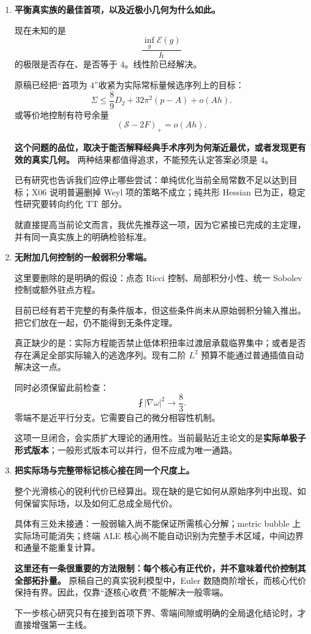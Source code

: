 \documentclass[
  10pt,
]{article}
\begin{document}
\begin{enumerate}
\def\labelenumi{\arabic{enumi}.}
\item
  \textbf{平衡真实族的最佳首项，以及近极小几何为什么如此。}

  现在未知的是 \[
  \frac{\inf_g\mathcal E(g)}h
  \] 的极限是否存在、是否等于 \(4\)。线性阶已经解决。

  原稿已经把``首项为 \(4\)''收紧为实际常标量候选序列上的目标： \[
  \boxed{\Sigma\le\frac89D_2+32\pi^2(p-A)+o(Ah).}
  \] 或等价地控制有符号余量 \[
  (\mathscr S-2F)_+=o(Ah).
  \]

  \textbf{这个问题的品位，取决于能否解释经典手术序列为何渐近最优，或者发现更有效的真实几何。}
  两种结果都值得追求，不能预先认定答案必须是 \(4\)。

  已有研究也告诉我们应停止哪些尝试：单纯优化当前全局常数不足以达到目标；X06
  说明普遍删掉 Weyl 项的策略不成立；纯共形 Hessian
  已为正，稳定性研究要转向约化 TT 部分。

  就直接提高当前论文而言，我优先推荐这一项，因为它紧接已完成的主定理，并有同一真实族上的明确检验标准。
\item
  \textbf{无附加几何控制的一般弱积分零端。}

  这里要删除的是明确的假设：点态 Ricci 控制、局部积分小性、统一 Sobolev
  控制或额外驻点方程。

  目前已经有若干完整的有条件版本，但这些条件尚未从原始弱积分输入推出。把它们放在一起，仍不能得到无条件定理。

  真正缺少的是：实际方程能否禁止低体积扭率过渡层承载临界集中；或者是否存在满足全部实际输入的逃逸序列。现有二阶
  \(L^2\) 预算不能通过普通插值自动解决这一点。

  同时必须保留此前检查： \[
  \fint|\nabla\omega|^2\longrightarrow\frac83.
  \] 零端不是近平行分支。它需要自己的微分相容性机制。

  这项一旦闭合，会实质扩大理论的通用性。当前最贴近主论文的是\textbf{实际单极子形式版本}；一般形式版本可以并行，但不应成为唯一通路。
\item
  \textbf{把实际场与完整带标记核心接在同一个尺度上。}

  整个光滑核心的锐利代价已经算出。现在缺的是它如何从原始序列中出现、如何保留实际场，以及如何汇总成全局代价。

  具体有三处未接通：一般弱输入尚不能保证所需核心分解；metric bubble
  上实际场可能消失；终端 ALE
  核心尚不能自动识别为完整手术区域，中间边界和通量不能重复计算。

  \textbf{这里还有一条很重要的方法限制：每个核心有正代价，并不意味着代价控制其全部拓扑量。}
  原稿自己的真实锐利模型中，Euler
  数随商阶增长，而核心代价保持有界。因此，仅靠``逐核心收费''不能解决一般零端。

  下一步核心研究只有在接到首项下界、零端间隙或明确的全局退化结论时，才直接增强第一主线。
\end{enumerate}
\end{document}
